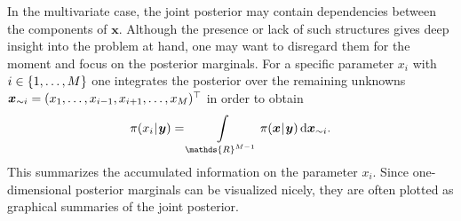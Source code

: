 \par %
In the multivariate case, the joint posterior may contain dependencies between the components of \(\bm{x}\).
Although the presence or lack of such structures gives deep insight into the problem at hand, one may want to disregard them for the moment and focus on the posterior marginals.
For a specific parameter \(x_i\) with \(i \in \{1,\ldots,M\}\) one integrates the posterior over the remaining unknowns
\(\bm{x}_{\sim i} = (x_1,\ldots,x_{i-1},x_{i+1},\ldots,x_M)^\top\) in order to obtain
\begin{equation} \label{eq:Bayesian:PosteriorMarginal}
  \pi(x_i \cond \bm{y}) = \int\limits_{\mathds{R}^{\dimParam-1}} \pi(\bm{x} \cond \bm{y}) \, \mathrm{d} \bm{x}_{\without i}.
\end{equation}
This summarizes the accumulated information on the parameter \(x_i\).
Since one-dimensional posterior marginals can be visualized nicely, they are often plotted as graphical summaries of the joint posterior.

